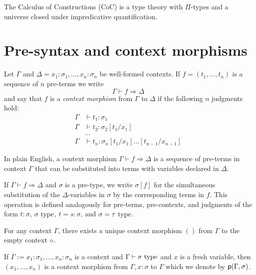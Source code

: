 \documentclass[a4paper]{article}
\begin{document}
The Calculus of Constructions (CoC) is a type theory with $\Pi$-types and a universe closed under impredicative quantification.

\section{Pre-syntax and context morphisms}\label{sec:pscm}

\begin{definition}[Hofmann]
  Let $\Gamma$ and $\Delta = x_1 : \sigma_1,\ldots,x_n : \sigma_n$ be well-formed contexts.
  If $f = (t_1,\ldots,t_n)$ is a sequence of $n$ pre-terms we write
  \[
    \Gamma \vdash f \Rightarrow \Delta
  \]
  and say that $f$ is a \emph{context morphism} from $\Gamma$ to $\Delta$ if the following $n$ judgments hold:
  \begin{align*}
    \Gamma &\vdash t_1 : \sigma_1\\
    \Gamma &\vdash t_2 : \sigma_2[t_1/x_1]\\
    &\ldots\\
    \Gamma &\vdash t_n : \sigma_n[t_1/x_1]\ldots[t_{n-1}/x_{n-1}]
  \end{align*}
\end{definition}

In plain English, a context morphism $\Gamma \vdash f \Rightarrow \Delta$ is a sequence of pre-terms in context $\Gamma$ that can be substituted into terms with variables declared in $\Delta$.

If $\Gamma \vdash f \Rightarrow \Delta$ and $\sigma$ is a pre-type, we write $\sigma[f]$ for the simultaneous substitution of the $\Delta$-variables in $\sigma$ by the corresponding terms in $f$.
This operation is defined analogously for pre-terms, pre-contexts, and judgments of the form $t : \sigma$, $\sigma~\mathrm{type}$, $t = s : \sigma$, and $\sigma = \tau~\mathrm{type}$.

\begin{example}
  For any context $\Gamma$, there exists a unique context morphism $()$ from $\Gamma$ to the empty context $\diamond$.
\end{example}

\begin{example}
  If $\Gamma := x_1 : \sigma_1,\ldots,x_{n} : \sigma_n$ is a context and $\Gamma \vdash \sigma~\mathrm{type}$ and $x$ is a fresh variable, then $(x_1,\ldots,x_n)$ is a context morphism from $\Gamma, x : \sigma$ to $\Gamma$ which we denote by $\operatorname{\mathsf{p}}(\Gamma,\sigma)$.
\end{example}
\end{document}
